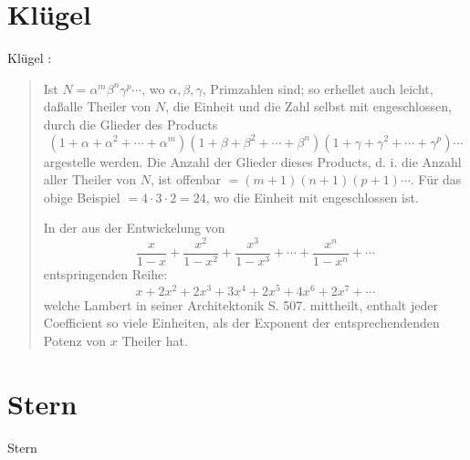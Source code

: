 \documentclass{article}
\begin{document}
\section{Kl\"ugel}
Kl\"ugel \cite[pp.~52--53, s.v. ``Theiler einer Zahl'', \S 12]{klugel}:

\begin{quote}
Ist $N=\alpha^m \beta^n \gamma^p\cdots$, wo $\alpha,\beta,\gamma$, Primzahlen sind; so erhellet auch leicht, da\ss alle Theiler
von $N$, die Einheit und die Zahl selbst mit engeschlossen, durch die Glieder des Products
\[
(1+\alpha+\alpha^2+\cdots+\alpha^m)(1+\beta+\beta^2+\cdots+\beta^n)(1+\gamma+\gamma^2+\cdots+\gamma^p)\cdots
\]
argestelle werden. Die Anzahl der Glieder dieses Products, d. i. die Anzahl aller Theiler von $N$, ist offenbar 
$=(m+1)(n+1)(p+1)\cdots$. F\"ur das obige Beispiel $=4\cdot 3 \cdot 2=24$, wo die Einheit mit engeschlossen ist.

In der aus der Entwickelung von
\[
\frac{x}{1-x}+\frac{x^2}{1-x^2}+\frac{x^3}{1-x^3}+\cdots+\frac{x^n}{1-x^n}+\cdots
\]
entspringenden Reihe:
\[
x+2x^2+2x^3+3x^4+2x^5+4x^6+2x^7+\cdots
\]
welche Lambert in seiner Architektonik S. 507. mittheilt, enthalt jeder Coefficient so viele Einheiten, als der Exponent der
entsprechendenden Potenz von $x$ Theiler hat.
\end{quote}



\section{Stern}
Stern \cite{stern}
\end{document}
